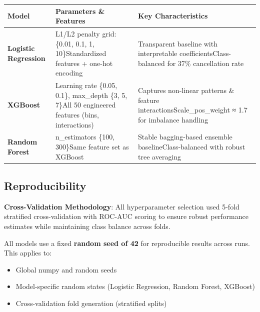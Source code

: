 \documentclass[
  letterpaper,
  DIV=11,
  numbers=noendperiod]{scrartcl}
\providecommand{\tightlist}{%
  \setlength{\itemsep}{0pt}\setlength{\parskip}{0pt}}
\begin{document}
\begin{longtable}[]{@{}
  >{\raggedright\arraybackslash}p{}
  >{\raggedright\arraybackslash}p{}
  >{\raggedright\arraybackslash}p{}@{}}
\toprule\noalign{}
\begin{minipage}[b]{\linewidth}\raggedright
Model
\end{minipage} & \begin{minipage}[b]{\linewidth}\raggedright
Parameters \& Features
\end{minipage} & \begin{minipage}[b]{\linewidth}\raggedright
Key Characteristics
\end{minipage} \\
\midrule\noalign{}
\endhead
\bottomrule\noalign{}
\endlastfoot
\textbf{Logistic Regression} & L1/L2 penalty grid: \{0.01, 0.1, 1,
10\}Standardized features + one-hot encoding & Transparent baseline with
interpretable coefficientsClass-balanced for 37\% cancellation rate \\
\textbf{XGBoost} & Learning rate \{0.05, 0.1\}, max\_depth \{3, 5,
7\}All 50 engineered features (bins, interactions) & Captures non-linear
patterns \& feature interactionsScale\_pos\_weight ≈ 1.7 for imbalance
handling \\
\textbf{Random Forest} & n\_estimators \{100, 300\}Same feature set as
XGBoost & Stable bagging-based ensemble baselineClass-balanced with
robust tree averaging \\
\end{longtable}

\subsection{Reproducibility}\label{reproducibility}

\textbf{Cross-Validation Methodology}: All hyperparameter selection used
5-fold stratified cross-validation with ROC-AUC scoring to ensure robust
performance estimates while maintaining class balance across folds.

All models use a fixed \textbf{random seed of 42} for reproducible
results across runs. This applies to:

\begin{itemize}
\tightlist
\item
  Global numpy and random seeds
\item
  Model-specific random states (Logistic Regression, Random Forest,
  XGBoost)
\item
  Cross-validation fold generation (stratified splits)
\end{itemize}
\end{document}
